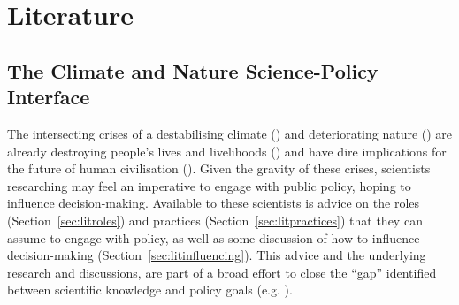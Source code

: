 \chapter{Literature}\label{ch:lit}

\section{The Climate and Nature Science-Policy Interface}\label{sec:litspi}

The intersecting crises of a destabilising climate (\cite{IIPCC2022}) and deteriorating nature (\cite{IPBES2022}) are already destroying people's lives and livelihoods (\cite{TschakertEAKO2019,SpaiserEtAl2024}) and have dire implications for the future of human civilisation (\cite{McKayEtAl2022,WEF2024,SpaiserEtAl2024}). Given the gravity of these crises, scientists researching \CAN{} may feel an imperative to engage with public policy, hoping to influence decision-making. Available to these scientists is advice on the roles (Section~\ref{sec:litroles}) and practices (Section~\ref{sec:litpractices}) that they can assume to engage with policy, as well as some discussion of how to influence decision-making (Section~\ref{sec:litinfluencing}). This advice and the underlying research and discussions, are part of a broad effort to close the ``gap'' identified between scientific knowledge and policy goals (e.g. \cite{RapleyD2014,KarlssonG2020,CairneyTS2023}).

